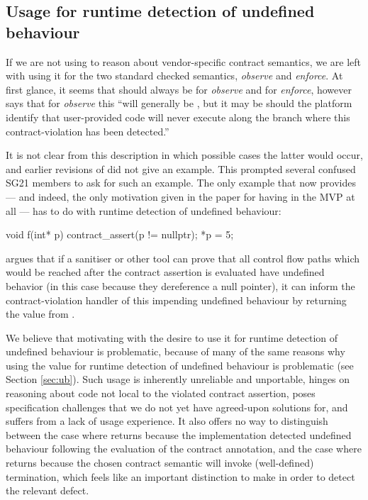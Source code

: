 \subsection{Usage for runtime detection of undefined behaviour}

If we are not using   to reason about vendor-specific contract semantics, we are left with using it for the two standard checked semantics, \emph{observe} and \emph{enforce}. At first glance, it seems that  should always be  for \emph{observe} and  for \emph{enforce}, however \cite{P2900R4} says that for \emph{observe} this ``will generally be , but it may be  should the platform identify that user-provided code will never execute along the branch where this contract-violation has been detected.''

It is not clear from this description in which possible cases the latter would occur, and earlier revisions of \cite{P2900R4} did not give an example. This prompted several confused SG21 members to ask for such an example. The only example that \cite{P2900R4} now provides --- and indeed, the only motivation given in the paper for having  in the MVP at all --- has to do with runtime detection of undefined behaviour:
\begin{codeblock}
void f(int* p) {
  contract_assert(p != nullptr);
  *p = 5;
}
\end{codeblock}
\cite{P2900R4} argues that if a sanitiser or other tool can prove that all control flow paths which would be reached after the contract assertion is evaluated have undefined behavior (in this case because they dereference a null pointer), it can inform the contract-violation handler of this impending undefined behaviour by returning the value  from .

We believe that motivating  with the desire to use it for runtime detection of undefined behaviour is problematic, because of many of the same reasons why using the value \mbox{} for runtime detection of undefined behaviour is problematic (see Section \ref{sec:ub}). Such usage is inherently unreliable and unportable, hinges on reasoning about code not local to the violated contract assertion, poses specification challenges that we do not yet have agreed-upon solutions for, and suffers from a lack of usage experience. It also offers no way to distinguish between the case where  returns  because the implementation detected undefined behaviour following the evaluation of the contract annotation, and the case where  returns  because the chosen contract semantic will invoke (well-defined) termination, which feels like an important distinction to make in order to detect the relevant defect.

